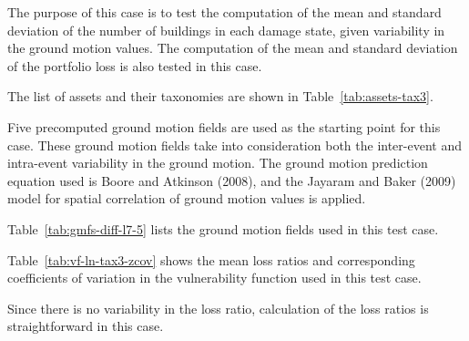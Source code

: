 The purpose of this case is to test the computation of the mean and standard deviation of the number of buildings in each damage state, given variability in the ground motion values. The computation of the mean and standard deviation of the portfolio loss is also tested in this case.


The list of assets and their taxonomies are shown in Table~\ref{tab:assets-tax3}.

Five precomputed ground motion fields are used as the starting point for this case. These ground motion fields take into consideration both the inter-event and intra-event variability in the ground motion. The ground motion prediction equation used is Boore and Atkinson (2008), and the Jayaram and Baker (2009) model for spatial correlation of ground motion values is applied.



Table~\ref{tab:gmfs-diff-l7-5} lists the ground motion fields used in this test case.




Table~\ref{tab:vf-ln-tax3-zcov} shows the mean loss ratios and corresponding coefficients of variation in the vulnerability function used in this test case.

Since there is no variability in the loss ratio, calculation of the loss ratios is straightforward in this case.